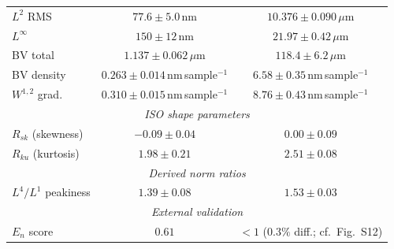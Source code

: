 \documentclass[review]{elsarticle}
\providecommand{\DIFaddtex}[1]{{\protect\color{blue}\uwave{#1}}} %
\providecommand{\DIFdeltex}[1]{{\protect\color{red}\sout{#1}}}                      %
\providecommand{\DIFaddFL}[1]{\DIFadd{#1}} %
\providecommand{\DIFdelFL}[1]{\DIFdel{#1}} %
\providecommand{\DIFaddbeginFL}{} %
\providecommand{\DIFaddendFL}{} %
\providecommand{\DIFdelbeginFL}{} %
\providecommand{\DIFdelendFL}{} %
\providecommand{\DIFadd}[1]{\texorpdfstring{\DIFaddtex{#1}}{#1}} %
\providecommand{\DIFdel}[1]{\texorpdfstring{\DIFdeltex{#1}}{}} %
\newcommand{\DIFscaledelfig}{0.5}
\newlength{\DIFdelgraphicswidth} %
\newlength{\DIFdelgraphicsheight} %
\newcommand{\DIFaddincludegraphics}[2][]{{\color{blue}\fbox{\DIFOincludegraphics[#1]{#2}}}} %
\newcommand{\DIFdelincludegraphics}[2][]{%
\sbox{\DIFdelgraphicsbox}{\DIFOincludegraphics[#1]{#2}}%
\settoboxwidth{\DIFdelgraphicswidth}{\DIFdelgraphicsbox} %
\settoboxtotalheight{\DIFdelgraphicsheight}{\DIFdelgraphicsbox} %
\scalebox{\DIFscaledelfig}{%
\parbox[b]{\DIFdelgraphicswidth}{\usebox{\DIFdelgraphicsbox}\\[-\baselineskip] \rule{\DIFdelgraphicswidth}{0em}}\llap{\resizebox{\DIFdelgraphicswidth}{\DIFdelgraphicsheight}{%
\setlength{\unitlength}{\DIFdelgraphicswidth}%
\begin{picture}(1,1)%
\thicklines\linethickness{2pt} %
{\color[rgb]{1,0,0}\put(0,0){\framebox(1,1){}}}%
{\color[rgb]{1,0,0}\put(0,0){\line( 1,1){1}}}%
{\color[rgb]{1,0,0}\put(0,1){\line(1,-1){1}}}%
\end{picture}%
}\hspace*{3pt}}} %
} %
\DeclareRobustCommand{\DIFaddbeginFL}{\DIFOaddbeginFL \let\includegraphics\DIFaddincludegraphics} %
\DeclareRobustCommand{\DIFaddendFL}{\DIFOaddendFL \let\includegraphics\DIFOincludegraphics} %
\DeclareRobustCommand{\DIFdelbeginFL}{\DIFOdelbeginFL \let\includegraphics\DIFdelincludegraphics} %
\DeclareRobustCommand{\DIFdelendFL}{\DIFOaddendFL \let\includegraphics\DIFOincludegraphics} %
\begin{document}
\begin{table}[htbp]
\begin{tabular}{lcc}
$L^2$ RMS & \DIFdelbeginFL \DIFdelFL{$77.6 \pm 5.0$}\DIFdelendFL \DIFaddbeginFL \DIFaddFL{$(77.6 \pm 5.0)$}\DIFaddendFL \,nm & \DIFdelbeginFL \DIFdelFL{$10.376 \pm 0.090$}\DIFdelendFL \DIFaddbeginFL \DIFaddFL{$(10.376 \pm 0.090)$}\DIFaddendFL \,$\mu$m \\
$L^{\infty}$ & \DIFdelbeginFL \DIFdelFL{$150 \pm 12$}\DIFdelendFL \DIFaddbeginFL \DIFaddFL{$(150 \pm 12)$}\DIFaddendFL \,nm & \DIFdelbeginFL \DIFdelFL{$21.97 \pm 0.42$}\DIFdelendFL \DIFaddbeginFL \DIFaddFL{$(21.97 \pm 0.42)$}\DIFaddendFL \,$\mu$m \\
BV total & \DIFdelbeginFL \DIFdelFL{$1.137 \pm 0.062$}\DIFdelendFL \DIFaddbeginFL \DIFaddFL{$(1.137 \pm 0.062)$}\DIFaddendFL \,$\mu$m & \DIFdelbeginFL \DIFdelFL{$118.4 \pm 6.2$}\DIFdelendFL \DIFaddbeginFL \DIFaddFL{$(118.4 \pm 6.2)$}\DIFaddendFL \,$\mu$m \\
BV density & \DIFdelbeginFL \DIFdelFL{$0.263 \pm 0.014$}\DIFdelendFL \DIFaddbeginFL \DIFaddFL{$(0.263 \pm 0.014)$}\DIFaddendFL \,nm\,sample$^{-1}$ & \DIFdelbeginFL \DIFdelFL{$6.58 \pm 0.35$}\DIFdelendFL \DIFaddbeginFL \DIFaddFL{$(6.58 \pm 0.35)$}\DIFaddendFL \,nm\,sample$^{-1}$ \\
$W^{1,2}$ grad. & \DIFdelbeginFL \DIFdelFL{$0.310 \pm 0.015$}\DIFdelendFL \DIFaddbeginFL \DIFaddFL{$(0.310 \pm 0.015)$}\DIFaddendFL \,nm\,sample$^{-1}$ & \DIFdelbeginFL \DIFdelFL{$8.76 \pm 0.43$}\DIFdelendFL \DIFaddbeginFL \DIFaddFL{$(8.76 \pm 0.43)$}\DIFaddendFL \,nm\,sample$^{-1}$ \\
\midrule
\multicolumn{3}{c}{\textit{ISO shape parameters}} \\
$R_{sk}$ (skewness) & $-0.09 \pm 0.04$ & $0.00 \pm 0.09$ \\
$R_{ku}$ (kurtosis) & $1.98 \pm 0.21$ & $2.51 \pm 0.08$ \\
\midrule
\multicolumn{3}{c}{\textit{Derived norm ratios}} \\
$L^4/L^1$ peakiness & $1.39 \pm 0.08$ & $1.53 \pm 0.03$ \\
\midrule
\multicolumn{3}{c}{\textit{External validation}} \\
$E_n$ score & $0.61$ & $<1$ ($0.3\%$ diff.; cf.~Fig.~S12) \\
\bottomrule
\end{tabular}
\end{table}
\end{document}
